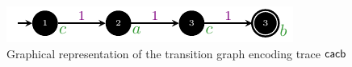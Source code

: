 %

\begin{figure}[!t]
	\centering
	\includegraphics[width=.4\textwidth]{images/taustar.pdf}
	\caption{Graphical representation of the transition graph encoding trace $\mathsf{cacb}$}\label{fig:taustar}
\end{figure}
%


